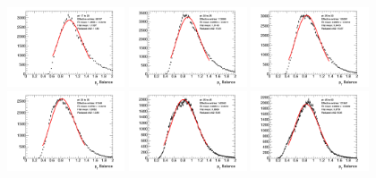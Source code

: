 \begin{figure}[t]
    \centering
    \includegraphics[width=0.31\textwidth]{plots/insitu/fits_insitubalance_smallR/Zeejet_Nominal_Bin0.png}
    \includegraphics[width=0.31\textwidth]{plots/insitu/fits_insitubalance_smallR/Zeejet_Nominal_Bin1.png}
    \includegraphics[width=0.31\textwidth]{plots/insitu/fits_insitubalance_smallR/Zeejet_Nominal_Bin2.png}
    \includegraphics[width=0.31\textwidth]{plots/insitu/fits_insitubalance_smallR/Zeejet_Nominal_Bin3.png}
    \includegraphics[width=0.31\textwidth]{plots/insitu/fits_insitubalance_smallR/Zeejet_Nominal_Bin4.png}
    \includegraphics[width=0.31\textwidth]{plots/insitu/fits_insitubalance_smallR/Zeejet_Nominal_Bin5.png}

\end{figure}
